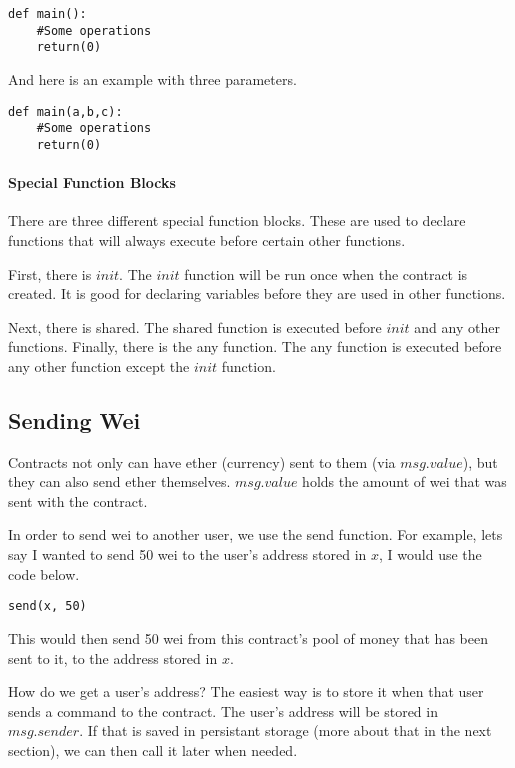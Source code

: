 \documentclass[12pt]{article}
\begin{document}
\begin{lstlisting}
def main():
	#Some operations
	return(0)
\end{lstlisting}

And here is an example with three parameters.

\begin{lstlisting}
def main(a,b,c):
	#Some operations
	return(0)
\end{lstlisting}

\paragraph{Special Function Blocks}
There are three different special function blocks. These are used to declare functions that will always execute before certain other functions.

First, there is $init$. The $init$ function will be run once when the contract is created. It is good for declaring variables before they are used in other functions.

Next, there is shared. The shared function is executed before $init$ and any other functions. Finally, there is the any function. The any function is executed before any other function except the $init$ function. \cite{Serpent}

\subsection{Sending Wei}
Contracts not only can have ether (currency) sent to them (via $msg.value$), but they can also send ether themselves. $msg.value$ holds the amount of wei that was sent with the contract.

In order to send wei to another user, we use the send function. For example, lets say I wanted to send 50 wei to the user's address stored in $x$, I would use the code below.

\begin{lstlisting}
send(x, 50)
\end{lstlisting}

This would then send 50 wei from this contract's pool of money that has been sent to it, to the address stored in $x$.

How do we get a user's address? The easiest way is to store it when that user sends a command to the contract. The user's address will be stored in $msg.sender$. If that is saved in persistant storage (more about that in the next section), we can then call it later when needed.
\end{document}
